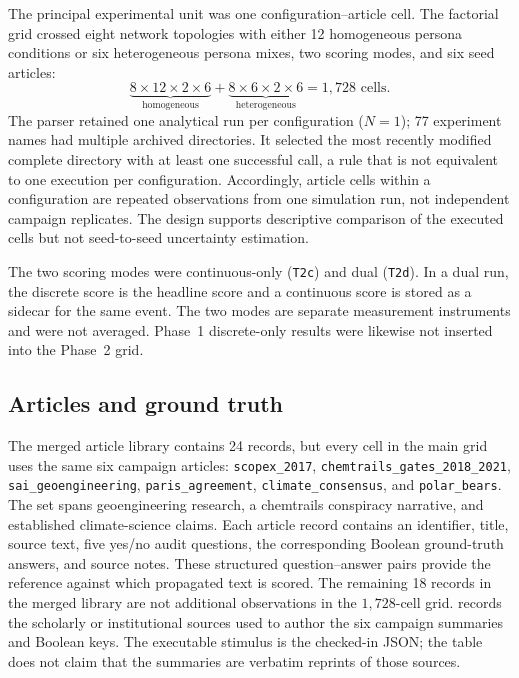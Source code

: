 The principal experimental unit was one configuration--article cell.  The
factorial grid crossed eight network topologies with either 12 homogeneous
persona conditions or six heterogeneous persona mixes, two scoring modes, and
six seed articles:
\begin{equation}
  \underbrace{8 \times 12 \times 2 \times 6}_{\text{homogeneous}}
  +
  \underbrace{8 \times 6 \times 2 \times 6}_{\text{heterogeneous}}
  = 1{,}728 \text{ cells}.
  \label{eq:phase2-grid}
\end{equation}
The parser retained one analytical run per configuration (\(N=1\)); 77
experiment names had multiple archived directories. It selected the most
recently modified complete directory with at least one successful call, a rule
that is not equivalent to one execution per configuration. Accordingly, article cells
within a configuration are repeated observations from one simulation run, not
independent campaign replicates.  The design supports descriptive comparison
of the executed cells but not seed-to-seed uncertainty estimation.

The two scoring modes were continuous-only (\texttt{T2c}) and dual
(\texttt{T2d}).  In a dual run, the discrete score is the headline score and a
continuous score is stored as a sidecar for the same event.  The two modes are
separate measurement instruments and were not averaged.  Phase~1
discrete-only results were likewise not inserted into the Phase~2 grid.

\subsection{Articles and ground truth}
\label{subsec:simulation-articles}

The merged article library contains 24 records, but every cell in the main grid
uses the same six campaign articles: \texttt{scopex\_2017},
\texttt{chemtrails\_gates\_2018\_2021},
\texttt{sai\_geoengineering}, \texttt{paris\_agreement},
\texttt{climate\_consensus}, and \texttt{polar\_bears}.  The set spans
geoengineering research, a chemtrails conspiracy narrative, and established
climate-science claims.  Each article record contains an identifier, title,
source text, five yes/no audit questions, the corresponding Boolean
ground-truth answers, and source notes.  These structured question--answer
pairs provide the reference against which propagated text is scored.  The
remaining 18 records in the merged library are not additional observations in
the \(1{,}728\)-cell grid.  records the scholarly
or institutional sources used to author the six campaign summaries and
Boolean keys. The executable stimulus is the checked-in JSON; the table does
not claim that the summaries are verbatim reprints of those sources.


